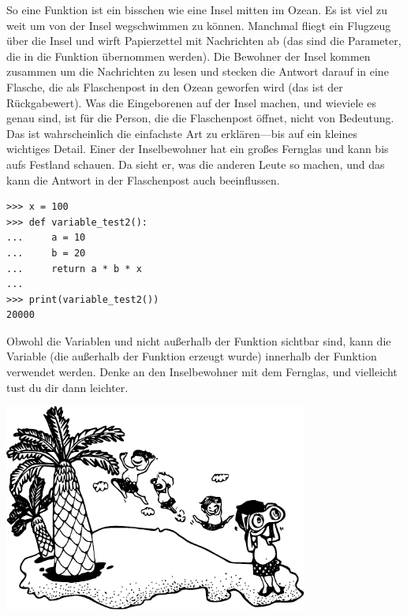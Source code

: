 So eine Funktion ist ein bisschen wie eine Insel mitten im Ozean. Es ist viel zu weit um von der Insel wegschwimmen zu können. Manchmal fliegt ein Flugzeug über die Insel und wirft Papierzettel mit Nachrichten ab (das sind die Parameter, die in die Funktion übernommen werden). Die Bewohner der Insel kommen zusammen um die Nachrichten zu lesen und stecken die Antwort darauf in eine Flasche, die als Flaschenpost in den Ozean geworfen wird (das ist der Rückgabewert). Was die Eingeborenen auf der Insel machen, und wieviele es genau sind, ist für die Person, die die Flaschenpost öffnet, nicht von Bedeutung. Das ist wahrscheinlich die einfachste Art  zu erklären---bis auf ein kleines wichtiges Detail. Einer der Inselbewohner hat ein großes Fernglas und kann bis aufs Festland schauen. Da sieht er, was die anderen Leute so machen, und das kann die Antwort in der Flaschenpost auch beeinflussen.

\begin{Verbatim}[frame=single]
>>> x = 100
>>> def variable_test2():
...     a = 10
...     b = 20
...     return a * b * x
...
>>> print(variable_test2())
20000
\end{Verbatim}

Obwohl die Variablen  und  nicht außerhalb der Funktion sichtbar sind, kann die Variable  (die außerhalb der Funktion erzeugt wurde) innerhalb der Funktion verwendet werden. Denke an den Inselbewohner mit dem Fernglas, und vielleicht tust du dir dann leichter.

\begin{center}
\includegraphics*[width=100mm]{images/islanders}
\end{center}

